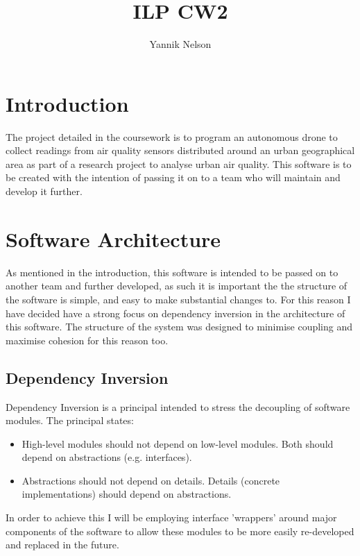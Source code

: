 \documentclass[12pt]{article}
\title{ILP CW2}
\author{Yannik Nelson}
\begin{document}
\maketitle

\tableofcontents \newpage
\section{Introduction}
The project detailed in the coursework is to program an autonomous drone to collect readings from air quality sensors distributed around an urban geographical area as part of a research project to analyse urban air quality.\newline
This software is to be created with the intention of passing it on to a team who will maintain and develop it further.

\section{Software Architecture}
As mentioned in the introduction, this software is intended to be passed on to another team and further developed, as such it is important the the structure of the software is simple, and easy to make substantial changes to. For this reason I have decided have a strong focus on dependency inversion in the architecture of this software. The structure of the system was designed to minimise coupling and maximise cohesion for this reason too.
\subsection{Dependency Inversion}
Dependency Inversion is a principal intended to stress the decoupling of software modules. The principal states:
\begin{itemize}
    \item High-level modules should not depend on low-level modules. Both should depend on abstractions (e.g. interfaces).
    \item Abstractions should not depend on details. Details (concrete implementations) should depend on abstractions.
\end{itemize}
In order to achieve this I will be employing interface 'wrappers' around major components of the software to allow these modules to be more easily re-developed and replaced in the future.
\end{document}
